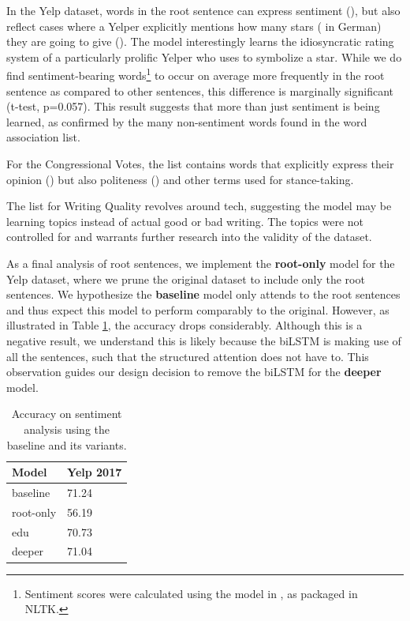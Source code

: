 In the Yelp dataset, words in the root sentence can express sentiment (), but also reflect cases where a Yelper explicitly mentions how many stars ( in German) they are going to give (). The model interestingly learns the idiosyncratic rating system of a particularly prolific Yelper who uses  to symbolize a star. While we do find sentiment-bearing words\footnote{Sentiment scores were calculated using the model in , as packaged in NLTK.} to occur on average more frequently in the root sentence as compared to other sentences, this difference is marginally significant (t-test, p=0.057). This result suggests that more than just sentiment is being learned, as confirmed by the many non-sentiment words found in the word association list.

For the Congressional Votes, the list contains words that explicitly express their opinion () but also politeness () and other terms used for stance-taking.

The list for Writing Quality revolves around tech, suggesting the model may be learning topics instead of actual good or bad writing. The topics were not controlled for and warrants further research into the validity of the dataset.

As a final analysis of root sentences, we implement the \textbf{root-only} model for the Yelp dataset, where we prune the original dataset to include only the root sentences. We hypothesize the \textbf{baseline} model only attends to the root sentences and thus expect this model to perform comparably to the original. However, as illustrated in Table \ref{tab:latent_accuracy_variants}, the accuracy drops considerably. Although this is a negative result, we understand this is likely because the biLSTM is making use of all the sentences, such that the structured attention does not have to. This observation guides our design decision to remove the biLSTM for the \textbf{deeper} model. 

\begin{table}[t]
\centering
\begin{tabular}{ll}
\toprule
Model &Yelp 2017 \\\hline \hline 
baseline &71.24  \\
root-only &56.19 \\
edu &70.73\\
deeper &71.04 \\
\bottomrule
\end{tabular}
\caption{Accuracy on sentiment analysis using the baseline  and its variants.}
\label{tab:latent_accuracy_variants}
\end{table}

